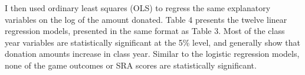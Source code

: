 \documentclass[12pt]{article}
\begin{document}
I then used ordinary least squares (OLS) to regress the same explanatory variables on the log of the amount donated. Table 4 presents the twelve linear regression models, presented in the same format as Table 3. Most of the class year variables are statistically significant at the 5\% level, and generally show that donation amounts increase in class year. Similar to the logistic regression models, none of the game outcomes or SRA scores are statistically significant.

\end{document}
